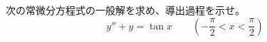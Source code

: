 
次の常微分方程式の一般解を求め、導出過程を示せ。
\[
y'' + y = \tan x \qquad \left(-\frac{\pi}{2} < x < \frac{\pi}{2}\right)
\]
